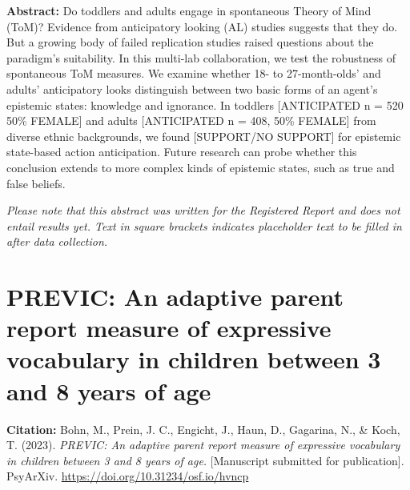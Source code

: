 \documentclass[
]{scrbook}
\begin{document}
\textbf{Abstract:} Do toddlers and adults engage in spontaneous Theory of Mind (ToM)? Evidence from anticipatory looking (AL) studies suggests that they do. But a growing body of failed replication studies raised questions about the paradigm's suitability. In this multi-lab collaboration, we test the robustness of spontaneous ToM measures. We examine whether 18- to 27-month-olds' and adults' anticipatory looks distinguish between two basic forms of an agent's epistemic states: knowledge and ignorance. In toddlers {[}ANTICIPATED n = 520 50\% FEMALE{]} and adults {[}ANTICIPATED n = 408, 50\% FEMALE{]} from diverse ethnic backgrounds, we found {[}SUPPORT/NO SUPPORT{]} for epistemic state-based action anticipation. Future research can probe whether this conclusion extends to more complex kinds of epistemic states, such as true and false beliefs.

\emph{Please note that this abstract was written for the Registered Report and does not entail results yet. Text in square brackets indicates placeholder text to be filled in after data collection.}

\newpage

\section*{PREVIC: An adaptive parent report measure of expressive vocabulary in children between 3 and 8 years of age}\label{previc}

\textbf{Citation:} Bohn, M., Prein, J. C., Engicht, J., Haun, D., Gagarina, N., \& Koch, T. (2023). \emph{PREVIC: An adaptive parent report measure of expressive vocabulary in children between 3 and 8 years of age.} {[}Manuscript submitted for publication{]}. PsyArXiv. \mbox{\url{https://doi.org/10.31234/osf.io/hvncp}}
\end{document}
